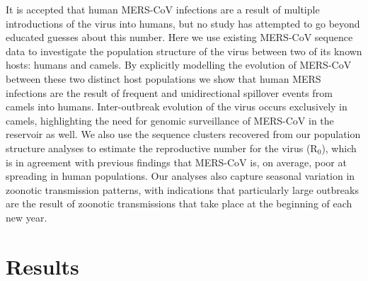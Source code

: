 \documentclass[11pt,oneside,letterpaper]{article}
\begin{document}
It is accepted that human MERS-CoV infections are a result of multiple introductions of the virus into humans, but no study has attempted to go beyond educated guesses about this number.
Here we use existing MERS-CoV sequence data to investigate the population structure of the virus between two of its known hosts: humans and camels.
By explicitly modelling the evolution of MERS-CoV between these two distinct host populations we show that human MERS infections are the result of frequent and unidirectional spillover events from camels into humans.
Inter-outbreak evolution of the virus occurs exclusively in camels, highlighting the need for genomic surveillance of MERS-CoV in the reservoir as well.
We also use the sequence clusters recovered from our population structure analyses to estimate the reproductive number for the virus (R$_{0}$), which is in agreement with previous findings that MERS-CoV is, on average, poor at spreading in human populations.
Our analyses also capture seasonal variation in zoonotic transmission patterns, with indications that particularly large outbreaks are the result of zoonotic transmissions that take place at the beginning of each new year.



%	

\section*{Results}
\end{document}
